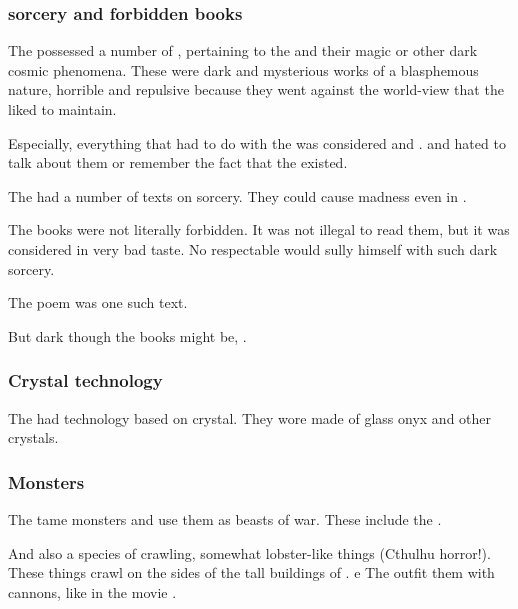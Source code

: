 \subsubsection{\Bane sorcery and forbidden books}
The \resphain possessed a number of , pertaining to the \SitraAchras and their magic or other dark cosmic phenomena. 
These were dark and mysterious works of a blasphemous nature, horrible and repulsive because they went against the world-view that the \resphain liked to maintain. 

Especially, everything that had to do with the \SitraAchras was considered  and . 
 and hated to talk about them or remember the fact that the \banes existed.

The \resphain had a number of texts on \SitraAchra sorcery.
They could cause madness even in \resphain.

The books were not literally forbidden. 
It was not illegal to read them, but it was considered in very bad taste. 
No respectable \resphan would sully himself with such dark sorcery. 

The poem \WanderersInDarknessEmph was one such  text. 

But dark though the \pps{\resphain} books might be, . 





\subsubsection{Crystal technology}
The \resphain{} had technology based on crystal. 
They wore \armour made of glass onyx and other crystals. 





\subsubsection{Monsters}
The \resphain{} tame monsters and use them as beasts of war. 
These include the . 

And also a species of crawling, somewhat lobster-like things (Cthulhu horror!). 
These things crawl on the sides of the tall buildings of \Nyx. e
The \resphain{} outfit them with cannons, like in the movie \cite{Movie:D-War}. 





